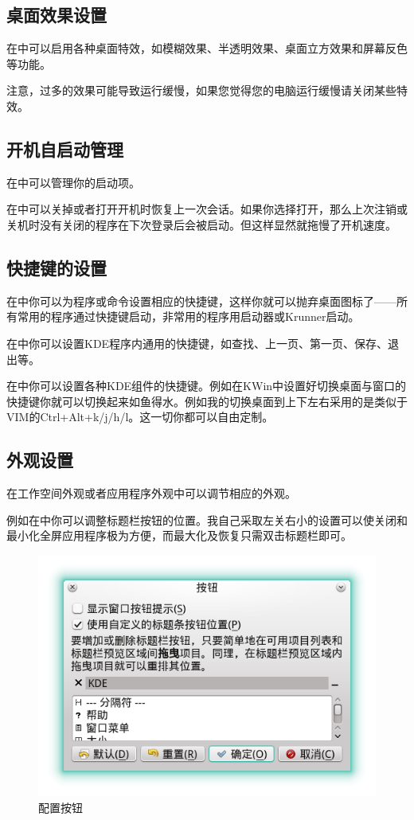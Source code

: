 \subsection{桌面效果设置}
在\me{}中可以启用各种桌面特效，如模糊效果、半透明效果、桌面立方效果和屏幕反色等功能。

注意，过多的效果可能导致运行缓慢，如果您觉得您的电脑运行缓慢请关闭某些特效。
\subsection{开机自启动管理}
在\me{}中可以管理你的启动项。

在\me{}中可以关掉或者打开开机时恢复上一次会话。如果你选择打开，那么上次注销或关机时没有关闭的程序在下次登录后会被启动。但这样显然就拖慢了开机速度。
\subsection{快捷键的设置}
在\me{}中你可以为程序或命令设置相应的快捷键，这样你就可以抛弃桌面图标了——所有常用的程序通过快捷键启动，非常用的程序用启动器或Krunner启动。

在\me{}中你可以设置KDE程序内通用的快捷键，如查找、上一页、第一页、保存、退出等。

在\me{}中你可以设置各种KDE组件的快捷键。例如在KWin中设置好切换桌面与窗口的快捷键你就可以切换起来如鱼得水。例如我的切换桌面到上下左右采用的是类似于VIM的Ctrl+Alt+k/j/h/l。这一切你都可以自由定制。
\subsection{外观设置}
在工作空间外观或者应用程序外观中可以调节相应的外观。

例如在\me{}\me{}中你可以调整标题栏按钮的位置。我自己采取左关右小的设置可以使关闭和最小化全屏应用程序极为方便，而最大化及恢复只需双击标题栏即可。
\begin{figure}[htbp!]
 \centering
 \includegraphics{./pic/botton.png}
 \caption{配置按钮}\label{botton}
\end{figure}

